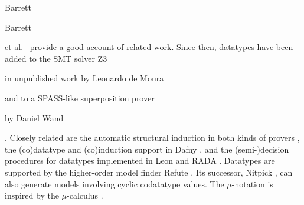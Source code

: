 \begin{rep} Barrett\end{rep}%
\begin{conf}Barrett\end{conf}
et al.\ \cite{barrett-et-al-2007} provide a good account of
related work. Since then, datatypes have been added to the SMT solver
Z3 \cite{de-moura-bjoerner-2008} \begin{rep}in unpublished work by Leonardo de Moura \end{rep}and to a SPASS-like %
superposition prover \begin{rep}by Daniel Wand\end{rep} \cite{wand-2014}.
Closely related are the automatic structural
induction in both kinds of provers \cite{kersani-peltier-2013,cruanes-201x,wand-weidenbach-201x,reynolds-kuncak-2015},
the (co)datatype and (co)induction support in Dafny \cite{leino-moskal-2014},
and the (semi-)decision procedures for datatypes
implemented in Leon \cite{suter-et-al-2011} and RADA \cite{pham-et-al-2013}.
%
Datatypes are supported by the higher-order model finder Refute
\cite{weber-2008}. Its successor, Nitpick \cite{blanchette-nipkow-2010}, can
also generate models involving cyclic codatatype values. The $\mu$-notation is
inspired by the $\mu$-calculus
\cite[etc.]{kozen-1983,endrullis-et-al-2011}.


%

\begin{conf}
\kern-2.9pt %
\end{conf}

